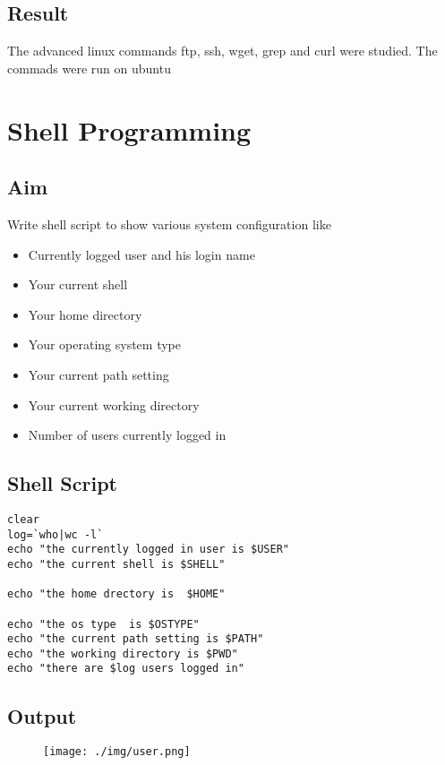\documentclass{article}
\begin{document}
\subsection{Result}
The advanced linux commands ftp, ssh, wget, grep and curl were studied. The commads were run on ubuntu

\begin{refsection}
\cite{ftpweb1}
\cite{ftpweb2}
\cite{curlweb}
\cite{wgetweb}
\cite{grepweb}
\printbibliography

\end{refsection}

\newpage

\section{Shell Programming}
\subsection{Aim}
Write shell script to show various system configuration like
\begin{itemize}
\item Currently logged user and his login name
\item Your current shell
\item Your home directory
\item Your operating system type
\item Your current path setting
\item Your current working directory
\item Number of users currently logged in
\end{itemize}

\subsection{Shell Script}
\begin{verbatim}
clear
log=`who|wc -l`
echo "the currently logged in user is $USER"
echo "the current shell is $SHELL"

echo "the home drectory is  $HOME"

echo "the os type  is $OSTYPE"
echo "the current path setting is $PATH"
echo "the working directory is $PWD"
echo "there are $log users logged in"
\end{verbatim}

\subsection{Output}
\begin{figure}[h!]
	\texttt{[image: ./img/user.png]}
\end{figure}
\end{document}
